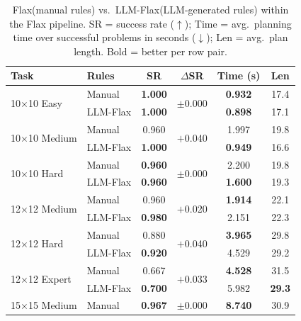 \documentclass[letterpaper, 10pt, journal, twoside]{IEEEtran}
\newcommand{\method}{LLM-Flax\xspace}
\newcommand{\baseline}{Flax\xspace}
\begin{document}
\begin{table}[t]
    \centering
    \caption{\baseline (manual rules) vs.\ \method (LLM-generated rules) within the Flax pipeline. SR = success rate ($\uparrow$); Time = avg.\ planning time over successful problems in seconds ($\downarrow$); Len = avg.\ plan length. Bold = better per row pair.}
    \label{tab:main}
    \small
    \setlength{\tabcolsep}{3.5pt}
    \renewcommand{\arraystretch}{1.05}
    \begin{tabular}{llcccc}
        \toprule
        \textbf{Task} & \textbf{Rules} & \textbf{SR} & \textbf{$\Delta$SR} & \textbf{Time (s)} & \textbf{Len} \\
        \midrule
        \multirow{2}{*}{10$\times$10 Easy}
            & Manual  & \textbf{1.000} & \multirow{2}{*}{$\pm$0.000} & \textbf{0.932} & 17.4 \\
            & \method & \textbf{1.000} &  & \textbf{0.898} & 17.1 \\
        \midrule
        \multirow{2}{*}{10$\times$10 Medium}
            & Manual  & 0.960 & \multirow{2}{*}{$+$0.040} & 1.997 & 19.8 \\
            & \method & \textbf{1.000} &  & \textbf{0.949} & 16.6 \\
        \midrule
        \multirow{2}{*}{10$\times$10 Hard}
            & Manual  & \textbf{0.960} & \multirow{2}{*}{$\pm$0.000} & 2.200 & 19.8 \\
            & \method & \textbf{0.960} &  & \textbf{1.600} & 19.3 \\
        \midrule
        \multirow{2}{*}{12$\times$12 Medium}
            & Manual  & 0.960 & \multirow{2}{*}{$+$0.020} & \textbf{1.914} & 22.1 \\
            & \method & \textbf{0.980} &  & 2.151 & 22.3 \\
        \midrule
        \multirow{2}{*}{12$\times$12 Hard}
            & Manual  & 0.880 & \multirow{2}{*}{$+$0.040} & \textbf{3.965} & 29.8 \\
            & \method & \textbf{0.920} &  & 4.529 & 29.2 \\
        \midrule
        \multirow{2}{*}{12$\times$12 Expert}
            & Manual  & 0.667 & \multirow{2}{*}{$+$0.033} & \textbf{4.528} & 31.5 \\
            & \method & \textbf{0.700} &  & 5.982 & \textbf{29.3} \\
        \midrule
        \multirow{2}{*}{15$\times$15 Medium}
            & Manual  & \textbf{0.967} & \multirow{2}{*}{$\pm$0.000} & \textbf{8.740} & 30.9 \\

\end{tabular}
\end{table}
\end{document}
